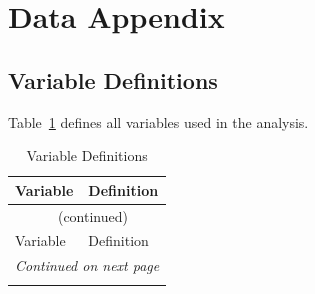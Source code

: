 
\section{Data Appendix}
\label{app:data}

\subsection{Variable Definitions}
\label{app:variable_defs}

Table~\ref{tab:vardefs} defines all variables used in the analysis.

\begin{longtable}{p{}p{}}
    \caption{Variable Definitions} \label{tab:vardefs} \\
    \toprule
    Variable & Definition \\
    \midrule
    \endfirsthead
    \multicolumn{2}{c}{\tablename~\thetable{} (continued)} \\
    \toprule
    Variable & Definition \\
    \midrule
    \endhead
    \midrule
    \multicolumn{2}{r}{\textit{Continued on next page}} \\
    \endfoot
    \bottomrule
    \endlastfoot


\end{longtable}
